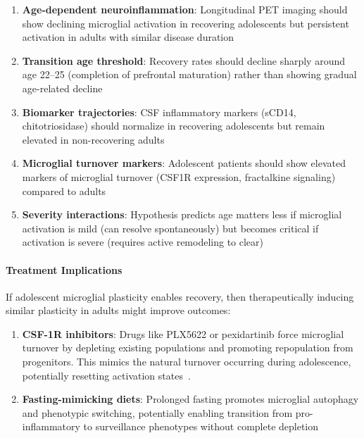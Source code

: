 \begin{hypothesis}
\begin{enumerate}
    \item \textbf{Age-dependent neuroinflammation}: Longitudinal PET imaging should show declining microglial activation in recovering adolescents but persistent activation in adults with similar disease duration

    \item \textbf{Transition age threshold}: Recovery rates should decline sharply around age 22--25 (completion of prefrontal maturation) rather than showing gradual age-related decline

    \item \textbf{Biomarker trajectories}: CSF inflammatory markers (sCD14, chitotriosidase) should normalize in recovering adolescents but remain elevated in non-recovering adults

    \item \textbf{Microglial turnover markers}: Adolescent patients should show elevated markers of microglial turnover (CSF1R expression, fractalkine signaling) compared to adults

    \item \textbf{Severity interactions}: Hypothesis predicts age matters less if microglial activation is mild (can resolve spontaneously) but becomes critical if activation is severe (requires active remodeling to clear)
\end{enumerate}

\paragraph{Treatment Implications}

If adolescent microglial plasticity enables recovery, then therapeutically inducing similar plasticity in adults might improve outcomes:

\begin{enumerate}
    \item \textbf{CSF-1R inhibitors}: Drugs like PLX5622 or pexidartinib force microglial turnover by depleting existing populations and promoting repopulation from progenitors. This mimics the natural turnover occurring during adolescence, potentially resetting activation states~\cite{MDPI2024microglial}.

    \item \textbf{Fasting-mimicking diets}: Prolonged fasting promotes microglial autophagy and phenotypic switching, potentially enabling transition from pro-inflammatory to surveillance phenotypes without complete depletion


\end{enumerate}
\end{hypothesis}
